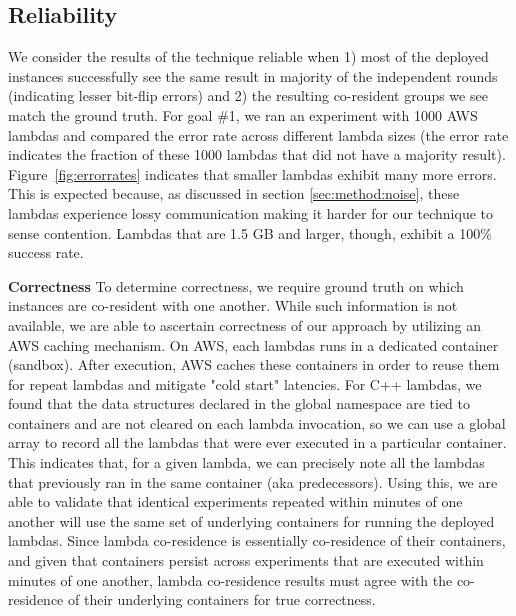 \subsection{Reliability}
We consider the results of the technique reliable when 1) most of the deployed
instances successfully see the same result in majority of the independent rounds
(indicating lesser bit-flip errors) and 2) the resulting co-resident groups we
see match the ground truth.  For goal \#1, we ran an experiment with 1000 AWS
lambdas and compared the error rate across different lambda sizes (the error
rate indicates the fraction of these 1000 lambdas that did not have a majority
result). Figure~\ref{fig:errorrates} indicates that smaller lambdas exhibit many
more errors.  This is expected because, as discussed in section
\ref{sec:method:noise}, these lambdas experience lossy communication making it
harder for our technique to sense contention. Lambdas that are 1.5 GB and
larger, though, exhibit a 100\% success rate.

\textbf{Correctness} 
To determine correctness, we require ground truth on which instances are
co-resident with one another. While such information is not available, we are
able to ascertain correctness of our approach by utilizing an AWS caching
mechanism. On AWS, each lambdas runs in a dedicated container (sandbox).  After
execution, AWS caches these containers in order to reuse
them~\cite{awscontainerreuse} for repeat lambdas and mitigate "cold start"
latencies. For C++ lambdas, we found that the data structures declared in the
global namespace are tied to containers and are not cleared on each lambda
invocation, so we can use a global array to record all the lambdas that were
ever executed in a particular container. This indicates that, for a given
lambda, we can precisely note all the lambdas that previously ran in the same
container (aka predecessors).  Using this, we are able to validate that
identical experiments repeated within minutes of one another will use the same
set of underlying containers for running the deployed lambdas. Since lambda
co-residence is essentially co-residence of their containers, and given that
containers persist across experiments that are executed within minutes of one
another, lambda co-residence results must agree with the co-residence of their
underlying containers for true correctness.


